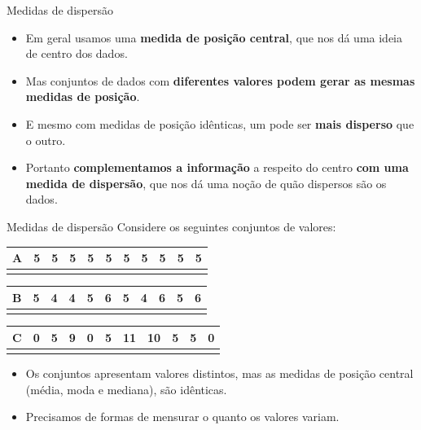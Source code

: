 \documentclass[
  ignorenonframetext,
  serif,
  professionalfont,
  usenames,
  dvipsnames,
  aspectratio = 169]{beamer}
\providecommand{\tightlist}{%
  \setlength{\itemsep}{0pt}\setlength{\parskip}{0pt}}
\renewcommand{\tightlist}{%
  \setlength{\itemsep}{0\baselineskip}
  \setlength{\parskip}{0.25\baselineskip}
}
\def\beginAHalfColumn{\begin{minipage}{0.49\textwidth}}%
\def\endColumns{\end{minipage}}%
\begin{document}
\begin{frame}{Medidas de dispersão}
\label{medidas-de-dispersuxe3o-1}
\begin{itemize}
\item
  Em geral usamos uma \textbf{medida de posição central}, que nos dá uma
  ideia de centro dos dados.
\item
  Mas conjuntos de dados com
  \textbf{diferentes valores podem gerar as mesmas medidas de posição}.
\item
  E mesmo com medidas de posição idênticas, um pode ser
  \textbf{mais disperso} que o outro.
\item
  Portanto \textbf{complementamos a informação} a respeito do centro
  \textbf{com uma medida de dispersão}, que nos dá uma noção de quão
  dispersos são os dados.
\end{itemize}
\end{frame}

\begin{frame}{Medidas de dispersão}
\label{medidas-de-dispersuxe3o-2}
Considere os seguintes conjuntos de valores:

\beginAHalfColumn

\begin{longtable}[]{@{}lrrrrrrrrrr@{}}
\toprule\noalign{}
\endhead
A & 5 & 5 & 5 & 5 & 5 & 5 & 5 & 5 & 5 & 5 \\
\bottomrule\noalign{}
\end{longtable}

\begin{longtable}[]{@{}lrrrrrrrrrr@{}}
\toprule\noalign{}
\endhead
B & 5 & 4 & 4 & 5 & 6 & 5 & 4 & 6 & 5 & 6 \\
\bottomrule\noalign{}
\end{longtable}

\begin{longtable}[]{@{}lrrrrrrrrrr@{}}
\toprule\noalign{}
\endhead
C & 0 & 5 & 9 & 0 & 5 & 11 & 10 & 5 & 5 & 0 \\
\bottomrule\noalign{}
\end{longtable}

\endColumns
\beginAHalfColumn

\begin{itemize}
\tightlist
\item
  Os conjuntos apresentam valores distintos, mas as medidas de posição
  central (média, moda e mediana), são idênticas.
\end{itemize}

\vspace{0.3cm}

\begin{itemize}
\tightlist
\item
  Precisamos de formas de mensurar o quanto os valores variam.
\end{itemize}

\endColumns
\end{frame}
\end{document}

